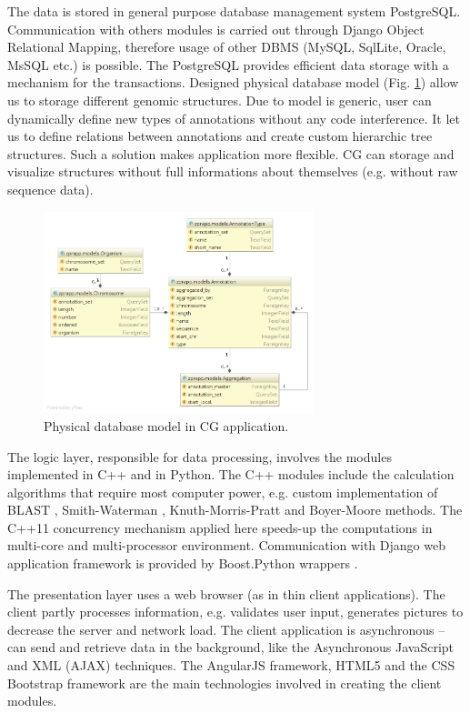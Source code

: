 \documentclass[a4paper]{spie}
\newcommand{\appShortcut}{CG}
\begin{document}
The data is stored in general purpose database management system PostgreSQL.
Communication with others modules is carried out through Django Object Relational Mapping,
therefore usage of other DBMS (MySQL, SqlLite, Oracle, MsSQL etc.) is possible.
The PostgreSQL provides efficient data storage with a mechanism for the transactions.
Designed physical database model (Fig. \ref{fig:db_model}) allow us to storage different genomic structures.
Due to model is generic, user can dynamically define new types of annotations without any code interference.
It let us to define relations between annotations and create custom hierarchic tree structures. Such a solution makes application more flexible.
\appShortcut{} can storage and visualize structures without full informations about themselves (e.g. without raw sequence data).

\begin{figure}[htp]
	\centering
	\includegraphics[width=0.7\textwidth]{img/db_model.png}
	\caption{Physical database model in \appShortcut{} application.}
	\label{fig:db_model}
\end{figure}

The logic layer, responsible for data processing, involves the modules implemented in C++ and in Python.
The C++ modules include the calculation algorithms that require most computer power,
e.g. custom implementation of BLAST \cite{altschul1997gapped}, Smith-Waterman \cite{smith1981identification}, Knuth-Morris-Pratt \cite{knuth1977fast}
and Boyer-Moore \cite{boyer1977fast} methods.
The C++11 concurrency mechanism applied here speeds-up the computations in multi-core and multi-processor environment.
Communication with Django web application framework is provided by Boost.Python wrappers \cite{rn:cpp}.

The presentation layer uses a web browser (as in thin client applications).
The client partly processes information, e.g. validates user input, generates pictures to decrease the server and network load.
The client application is asynchronous -- can send and retrieve data in the background, like the Asynchronous JavaScript and XML (AJAX) techniques.
The AngularJS framework, HTML5 and the CSS Bootstrap framework are the main technologies involved in creating the client modules.
\end{document}

